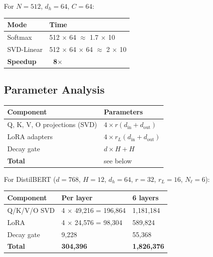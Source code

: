 For $N = 512$, $d_h = 64$, $C = 64$:

\begin{table}[H]
\centering
\small
\begin{tabular}{ll}
\toprule
\textbf{Mode} & \textbf{Time} \\
\midrule
Softmax & 512  $\times$ 64 $\approx$ 1.7 $\times$ 10 \\
SVD-Linear & 512 $\times$ 64 $\times$ 64 $\approx$ 2 $\times$ 10 \\
\textbf{Speedup} & \textbf{~8$\times$} \\
\bottomrule
\end{tabular}
\end{table}

\subsection{Parameter Analysis}

\begin{table}[H]
\centering
\small
\begin{tabular}{ll}
\toprule
\textbf{Component} & \textbf{Parameters} \\
\midrule
Q, K, V, O projections (SVD) & $4 \times r(d_\text{in} + d_\text{out})$ \\
LoRA adapters & $4 \times r_L(d_\text{in} + d_\text{out})$ \\
Decay gate & $d \times H + H$ \\
\textbf{Total} & see below \\
\bottomrule
\end{tabular}
\end{table}

For DistilBERT ($d = 768$, $H = 12$, $d_h = 64$, $r = 32$, $r_L = 16$, $N_\ell = 6$):

\begin{table}[H]
\centering
\small
\begin{tabular}{lll}
\toprule
\textbf{Component} & \textbf{Per layer} & \textbf{6 layers} \\
\midrule
Q/K/V/O SVD & 4 $\times$ 49,216 = 196,864 & 1,181,184 \\
LoRA & 4 $\times$ 24,576 = 98,304 & 589,824 \\
Decay gate & 9,228 & 55,368 \\
\textbf{Total} & \textbf{304,396} & \textbf{1,826,376} \\
\bottomrule
\end{tabular}
\end{table}

